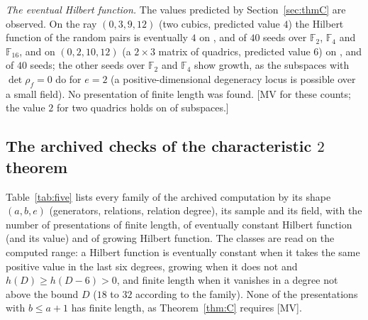 \documentclass[11pt]{article}
\theoremstyle{definition}
\theoremstyle{remark}
\newcommand{\F}{\mathbb{F}}
\begin{document}
\begin{table}[htbp]
\centering\footnotesize

\caption{Generic presentations with $B_0$ generators and $B_1$ relations of degree $d_1$ for the eight rays of the characteristic $2$ study: pure hits out of the seeds, the hit rate and its binomial standard error, over $\F_{32003}$ (20 seeds) and over $\F_2$, $\F_4$ and $\F_{16}$ (40 seeds each); the presentation column reads generators times relations.}
\label{tab:b1}
\end{table}

\emph{The eventual Hilbert function.} The values predicted by Section~\ref{sec:thmC} are observed. On the ray $(0,3,9,12)$ (two cubics, predicted value $4$) the Hilbert function of the random pairs is eventually $4$ on \nevCubicTwo{}, \nevCubicFour{} and \nevCubicSixteen{} of $40$ seeds over $\F_2$, $\F_4$ and $\F_{16}$, and on $(0,2,10,12)$ (a $2\times3$ matrix of quadrics, predicted value $6$) on \nevQuadTwo{}, \nevQuadFour{} and \nevQuadSixteen{} of $40$ seeds; the other seeds over $\F_2$ and $\F_4$ show growth, as the subspaces with $\det\rho_f=0$ do for $e=2$ (a positive-dimensional degeneracy locus is possible over a small field). No presentation of finite length was found. [MV for these counts; the value $2$ for two quadrics holds on \nevTwoGFtwo{} of \nsubGFtwo{} subspaces.]

\subsection{The archived checks of the characteristic \texorpdfstring{$2$}{2} theorem}
\label{sec:resfive}

Table~\ref{tab:five} lists every family of the archived computation by its shape $(a,b,e)$ (generators, relations, relation degree), its sample and its field, with the number of presentations of finite length, of eventually constant Hilbert function (and its value) and of growing Hilbert function. The classes are read on the computed range: a Hilbert function is eventually constant when it takes the same positive value in the last six degrees, growing when it does not and $h(D)\ge h(D-6)>0$, and finite length when it vanishes in a degree not above the bound $D$ ($18$ to $32$ according to the family). None of the \nfiveDone{} presentations with $b\le a+1$ has finite length, as Theorem~\ref{thm:C} requires [MV].

\begin{table}[htbp]
\centering\footnotesize

\caption{Presentations with $b\le a+1$ relations of degree $e$ in characteristic $2$ (all subspaces over $\F_2$ for the first three rows, random draws with seed $20261120+$ index for the others): number of cases, of cases with finite length, of cases with an eventually constant Hilbert function (with its value) and of cases with a growing one; the values are those of Table~\ref{tab:eventual}.}
\label{tab:five}
\end{table}
\end{document}
